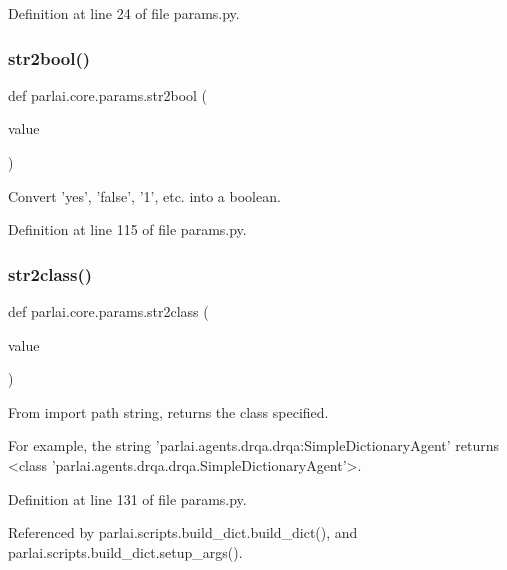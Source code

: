 Definition at line 24 of file params.\+py.

\mbox{\label{namespaceparlai_1_1core_1_1params_a714c9ed20ecfb4f9d524ccbe3510fecc}} 
\subsubsection{\texorpdfstring{str2bool()}{str2bool()}}
{\footnotesize\ttfamily def parlai.\+core.\+params.\+str2bool (\begin{DoxyParamCaption}\item[{}]{value }\end{DoxyParamCaption})}

\begin{DoxyVerb}Convert 'yes', 'false', '1', etc. into a boolean.\end{DoxyVerb}
 

Definition at line 115 of file params.\+py.

\mbox{\label{namespaceparlai_1_1core_1_1params_aa6083a72ad328d26016bd5f805a0b1c8}} 
\subsubsection{\texorpdfstring{str2class()}{str2class()}}
{\footnotesize\ttfamily def parlai.\+core.\+params.\+str2class (\begin{DoxyParamCaption}\item[{}]{value }\end{DoxyParamCaption})}

\begin{DoxyVerb}From import path string, returns the class specified.

For example, the string 'parlai.agents.drqa.drqa:SimpleDictionaryAgent'
returns <class 'parlai.agents.drqa.drqa.SimpleDictionaryAgent'>.
\end{DoxyVerb}
 

Definition at line 131 of file params.\+py.



Referenced by parlai.\+scripts.\+build\+\_\+dict.\+build\+\_\+dict(), and parlai.\+scripts.\+build\+\_\+dict.\+setup\+\_\+args().

